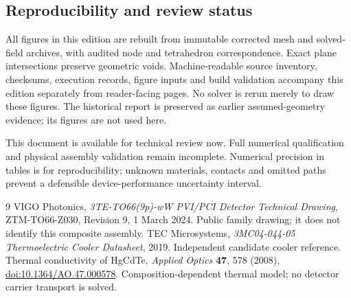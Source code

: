 \documentclass[11pt,a4paper]{article}
\begin{document}
\subsection{Reproducibility and review status}
All figures in this edition are rebuilt from immutable corrected mesh and solved-field archives, with audited node and tetrahedron correspondence. Exact plane intersections preserve geometric voids. Machine-readable source inventory, checksums, execution records, figure inputs and build validation accompany this edition separately from reader-facing pages. No solver is rerun merely to draw these figures. The historical report is preserved as earlier assumed-geometry evidence; its figures are not used here.

This document is available for technical review now. Full numerical qualification and physical assembly validation remain incomplete. Numerical precision in tables is for reproducibility; unknown materials, contacts and omitted paths prevent a defensible device-performance uncertainty interval.

\begin{thebibliography}{9}
 VIGO Photonics, \emph{3TE-TO66(9p)-wW PVI/PCI Detector Technical Drawing}, ZTM-TO66-Z030, Revision 9, 1 March 2024. Public family drawing; it does not identify this composite assembly.
 TEC Microsystems, \emph{3MC04-044-05 Thermoelectric Cooler Datasheet}, 2019. Independent candidate cooler reference.
 Thermal conductivity of HgCdTe, \emph{Applied Optics} \textbf{47}, 578 (2008), \href{https://doi.org/10.1364/AO.47.000578}{doi:10.1364/AO.47.000578}. Composition-dependent thermal model; no detector carrier transport is solved.
\end{thebibliography}
\end{document}
